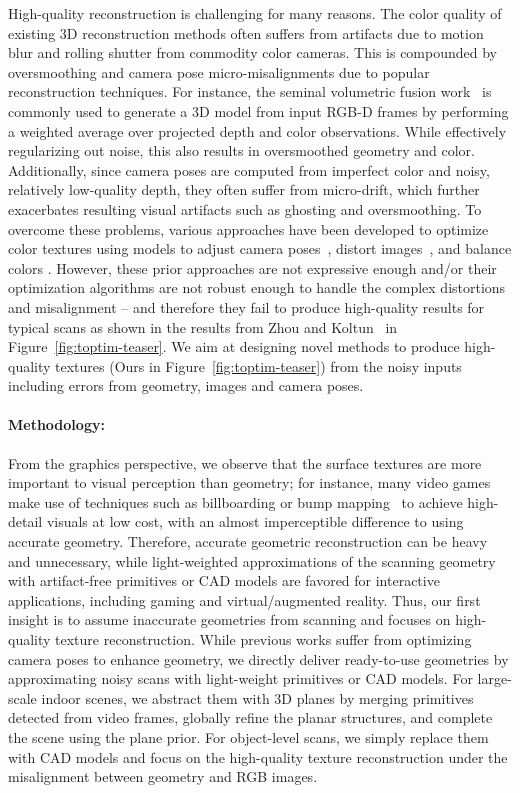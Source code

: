 High-quality reconstruction is challenging for many reasons. The color quality of existing 3D reconstruction methods often suffers from artifacts due to motion blur and rolling shutter from commodity color cameras. 
This is compounded by oversmoothing and camera pose micro-misalignments due to popular reconstruction techniques.
For instance, the seminal volumetric fusion work~\cite{curless1996volumetric} is commonly used to generate a 3D model from input RGB-D frames by performing a weighted average over projected depth and color observations.
While effectively regularizing out noise, this also results in oversmoothed geometry and color.
Additionally, since camera poses are computed from imperfect color and noisy, relatively low-quality depth, they often suffer from micro-drift, which further exacerbates resulting visual artifacts such as ghosting and oversmoothing. To overcome these problems, various approaches have been developed to optimize color textures using models to adjust camera poses~\cite{zhou2014color}, distort images~\cite{bi2017patch,zhou2014color}, and balance colors \cite{zhou2014color}.  However, these prior approaches are not expressive enough and/or their optimization algorithms are not robust enough to handle the complex distortions and misalignment -- and therefore they fail to produce high-quality results for typical scans as shown in the results from Zhou and Koltun~\cite{zhou2014color} in Figure~\ref{fig:toptim-teaser}. We aim at designing novel methods to produce high-quality textures (Ours in Figure~\ref{fig:toptim-teaser}) from the noisy inputs including errors from geometry, images and camera poses.

\paragraph*{Methodology:} From the graphics perspective, we observe that the surface textures are more important to visual perception than geometry; for instance, many video games make use of techniques such as billboarding or bump mapping~\cite{decoret1999multi}
to achieve high-detail visuals at low cost, with an almost imperceptible difference to using accurate geometry. Therefore, accurate geometric reconstruction can be heavy and unnecessary, while light-weighted approximations of the scanning geometry with artifact-free primitives or CAD models are favored for interactive applications, including gaming and virtual/augmented reality. 
%
Thus, our first insight is to assume inaccurate geometries from scanning and focuses on high-quality texture reconstruction. While previous works suffer from optimizing camera poses to enhance geometry, we directly deliver ready-to-use geometries by approximating noisy scans with light-weight primitives or CAD models.
%
For large-scale indoor scenes, we abstract them with 3D planes by merging primitives detected from video frames, globally refine the planar structures, and complete the scene using the plane prior. For object-level scans, we simply replace them with CAD models and focus on the high-quality texture reconstruction under the misalignment between geometry and RGB images.

